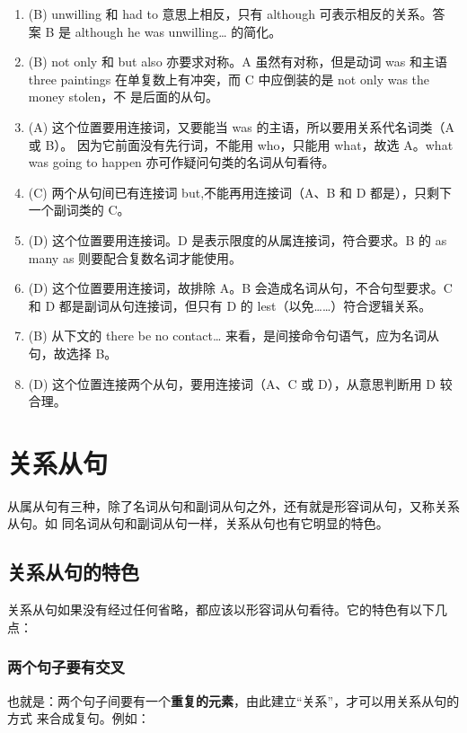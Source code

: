 \begin{enumerate}
\item (B) unwilling 和 had to 意思上相反，只有 although 可表示相反的关系。答
  案 B 是 although he was unwilling… 的简化。

\item (B) not only 和 but also 亦要求对称。A 虽然有对称，但是动词 was 和主语 three
  paintings 在单复数上有冲突，而 C 中应倒装的是 not only was the money stolen，不
  是后面的从句。


\item (A) 这个位置要用连接词，又要能当 was 的主语，所以要用关系代名词类（A 或 B）。
  因为它前面没有先行词，不能用 who，只能用 what，故选 A。what was going to
  happen 亦可作疑问句类的名词从句看待。

\item  (C) 两个从句间已有连接词 but,不能再用连接词（A、B 和 D 都是），只剩下一个副词类的 C。

\item (D) 这个位置要用连接词。D 是表示限度的从属连接词，符合要求。B 的 as many as 则要配合复数名词才能使用。
\item (D) 这个位置要用连接词，故排除 A。B 会造成名词从句，不合句型要求。C 和 D 都是副词从句连接词，但只有 D 的 lest（以免……）符合逻辑关系。
\item (B) 从下文的 there be no contact… 来看，是间接命令句语气，应为名词从句，故选择 B。

\item (D) 这个位置连接两个从句，要用连接词（A、C 或 D），从意思判断用 D 较合理。
\end{enumerate}
\chapter{关系从句}

从属从句有三种，除了名词从句和副词从句之外，还有就是形容词从句，又称关系从句。如
同名词从句和副词从句一样，关系从句也有它明显的特色。

\section{关系从句的特色}

关系从句如果没有经过任何省略，都应该以形容词从句看待。它的特色有以下几点：

\subsection{两个句子要有交叉}

也就是：两个句子间要有一个\textbf{重复的元素}，由此建立“关系”，才可以用关系从句的方式
来合成复句。例如：

